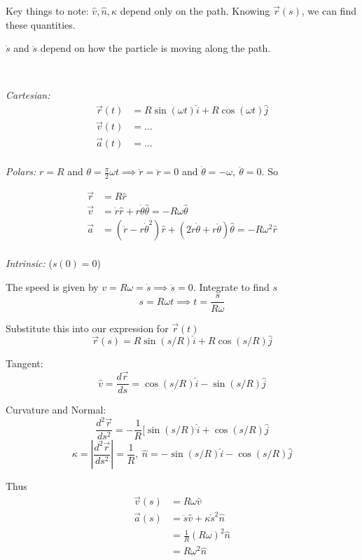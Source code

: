 \documentclass[10pt]{scrartcl}
\begin{document}
Key things to note: $\hat{v}, \hat{n}, \kappa$ depend only on the path. Knowing $\vec{r}(s)$, we can find these 	quantities. 

$\dot{s}$ and $\ddot{s}$ depend on how the particle is moving along the path.

\pagebreak


\begin{example}~

\emph{Cartesian:}
\[\begin{aligned}
\vec{r}(t) &= R\sin(\omega t)\hat{i} + R\cos(\omega t)\hat{j}\\
\vec{v}(t) &= \dots\\
\vec{a}(t) &= \dots
\end{aligned}
\]~\\


\emph{Polars:} 
$r = R$ and $\theta = \frac{\pi}{2} \omega t \implies \dot{r} = \ddot{r} = 0$ and $ \dot{\theta} = -\omega,~\ddot{\theta} = 0$. So 

\[\begin{aligned}
	\vec{r} &= R\hat{r}\\
 \vec{v} &= \dot{r}\hat{r} + r\dot{\theta}\hat{\theta} = -R\omega\hat{\theta}\\
\vec{a} &= (\ddot{r} - r\dot{\theta}^2)\hat{r} + (2\dot{r}\dot{\theta} + r\ddot{\theta})\hat{\theta} = -R\omega^2\hat{r}
\end{aligned}
\]~\\


\emph{Intrinsic:} ($s(0) = 0$) 

The speed is given by $v = R\omega = \dot{s} \implies \ddot{s} = 0$. Integrate to find $s$
\[s = R\omega t \implies t= \frac{s}{R\omega}\]

Substitute this into our expression for $\vec{r}(t)$
\[\vec{r}(s) = R\sin(s/R)\hat{i} + R\cos(s/R)\hat{j}\]

Tangent: 
\[\hat{v} = \dfrac{d\vec{r}}{ds} = \cos(s/R)\hat{i} - \sin(s/R)\hat{j}\]

Curvature and Normal:
\[\dfrac{d^2\vec{r}}{ds^2} = -\dfrac{1}{R}[\sin(s/R)\hat{i} + \cos(s/R)\hat{j}\]
\[ \kappa = \left|\dfrac{d^2\vec{r}}{ds^2} \right| = \dfrac{1}{R},~ \hat{n} = -\sin(s/R)\hat{i} - \cos(s/R)\hat{j}\]

Thus
\[\begin{aligned}
\vec{v}(s) &= R\omega \hat{v}\\
\vec{a}(s) &= \ddot{s}\hat{v} + \kappa \dot{s}^2\hat{n}\\
& = \frac{1}{R}(R\omega)^2\hat{n}\\ &= R\omega^2\hat{n}
\end{aligned}
\]
\end{example}
\end{document}
